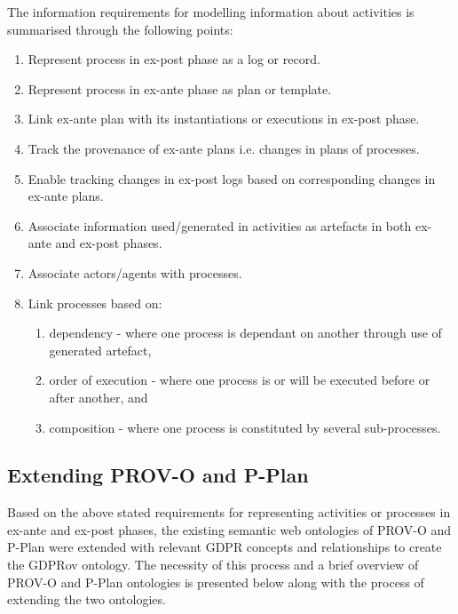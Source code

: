 The information requirements for modelling information about activities is summarised through the following points:
\begin{enumerate}
    \item Represent process in ex-post phase as a log or record.
    \item Represent process in ex-ante phase as plan or template.
    \item Link ex-ante plan with its instantiations or executions in ex-post phase.
    \item Track the provenance of ex-ante plans i.e. changes in plans of processes.
    \item Enable tracking changes in ex-post logs based on corresponding changes in ex-ante plans.
    \item Associate information used/generated in activities as artefacts in both ex-ante and ex-post phases.
    \item Associate actors/agents with processes.
    \item Link processes based on:
        \begin{enumerate}
            \item dependency - where one process is dependant on another through use of generated artefact,
            \item order of execution - where one process is or will be executed before or after another, and
            \item composition - where one process is constituted by several sub-processes.
        \end{enumerate}
\end{enumerate}

\subsection{Extending PROV-O and P-Plan}
Based on the above stated requirements for representing activities or processes in ex-ante and ex-post phases, the existing semantic web ontologies of PROV-O \cite{lebo_prov-o_2013} and P-Plan \cite{garijo_p-plan_2014} were extended with relevant GDPR concepts and relationships to create the GDPRov ontology. The necessity of this process and a brief overview of PROV-O and P-Plan ontologies is presented below along with the process of extending the two ontologies.

